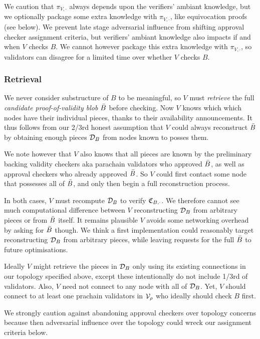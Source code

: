 We caution that $\pi_{V,\cdot}$ always depends upon the verifiers' ambiant knowledge, but we optionally package some extra knowledge with $\pi_{V,\cdot}$, like equivocation proofs (see below).  We prevent late stage adversarial influence from shifting approval checker assignment criteria, but verifiers' ambiant knowledge also impacts if and when $V$ checks $B$.  We cannot however package this extra knowledge with $\pi_{V,\cdot}$, so validators can disagree for a limited time over whether $V$ checks $B$.

\subsubsection{Retrieval}

We never consider substructure of $B$ to be meaningful, so $V$ must {\em retrieve} the full {\em candidate proof-of-validity blob} $\bar{B}$ before checking.  Now $V$ knows which which nodes have their individual pieces, thanks to their availability announcements.  It thus follows from our 2/3rd honest assumption that $V$ could always reconstruct $\bar{B}$ by obtaining enough pieces $\mathcal{D}_B$ from nodes known to posses them.  

We note however that $V$ also knows that all pieces are known by the preliminary backing validity checkers aka parachain validators who approved $\bar{B}$, as well as approval checkers who already approved $\bar{B}$.  So $V$ could first contact some node that possesses all of $\bar{B}$, and only then begin a full reconstruction process. 

In both cases, $V$ must recompute $\mathcal{D}_B$ to verify $\mathfrak{C}_{B,\cdot}$.  We therefore cannot see much computational difference between $V$ reconstructing $\mathcal{D}_B$ from arbitrary pieces or from $\bar{B}$ itself.  It remains plausible $V$ avoids some networking overhead by asking for $\bar{B}$ though.  We think a first implementation could reasonably target reconstructing $\mathcal{D}_B$ from arbitrary pieces, while leaving requests for the full $\bar{B}$ to future optimisations. 

Ideally $V$ might retrieve the pieces in $\mathcal{D}_B$ only using its existing connections in our topology specified above, except these intentionally do not include 1/3rd of validators.  Also, $V$ need not connect to any node with all of $\mathcal{D}_B$.  Yet, $V$ should connect to at least one prachain validators in $\mathcal{V}_\rho$ who ideally should check $B$ first.  

We strongly caution against abandoning approval checkers over topology concerns because then adversarial influence over the topology could wreck our assignment criteria below.

